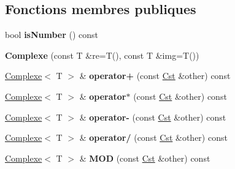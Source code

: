 \subsection*{Fonctions membres publiques}
\begin{DoxyCompactItemize}
\item 
\hypertarget{classcalcul_1_1_complexe_aaaceac3092c068cb9a47c368f072f233}{bool {\bfseries is\-Number} () const }\label{classcalcul_1_1_complexe_aaaceac3092c068cb9a47c368f072f233}

\item 
\hypertarget{classcalcul_1_1_complexe_ad37d17f91ebe787d4f19ab451200c7e0}{{\bfseries Complexe} (const T \&re=T(), const T \&img=T())}\label{classcalcul_1_1_complexe_ad37d17f91ebe787d4f19ab451200c7e0}

\item 
\hypertarget{classcalcul_1_1_complexe_aa0cc9d9fa0457a719a452758ffbb105c}{\hyperlink{classcalcul_1_1_complexe}{Complexe}$<$ T $>$ \& {\bfseries operator+} (const \hyperlink{classcalcul_1_1_cst}{Cst} \&other) const }\label{classcalcul_1_1_complexe_aa0cc9d9fa0457a719a452758ffbb105c}

\item 
\hypertarget{classcalcul_1_1_complexe_ad4d85ff5336cb7cc292688c04fb4bccd}{\hyperlink{classcalcul_1_1_complexe}{Complexe}$<$ T $>$ \& {\bfseries operator$\ast$} (const \hyperlink{classcalcul_1_1_cst}{Cst} \&other) const }\label{classcalcul_1_1_complexe_ad4d85ff5336cb7cc292688c04fb4bccd}

\item 
\hypertarget{classcalcul_1_1_complexe_abf3f2f71cc9914634a69afe681a67a25}{\hyperlink{classcalcul_1_1_complexe}{Complexe}$<$ T $>$ \& {\bfseries operator-\/} (const \hyperlink{classcalcul_1_1_cst}{Cst} \&other) const }\label{classcalcul_1_1_complexe_abf3f2f71cc9914634a69afe681a67a25}

\item 
\hypertarget{classcalcul_1_1_complexe_ac24e53f143838aff4063fdfbc9255bba}{\hyperlink{classcalcul_1_1_complexe}{Complexe}$<$ T $>$ \& {\bfseries operator/} (const \hyperlink{classcalcul_1_1_cst}{Cst} \&other) const }\label{classcalcul_1_1_complexe_ac24e53f143838aff4063fdfbc9255bba}

\item 
\hypertarget{classcalcul_1_1_complexe_a643bd98fc0db34fa8c1f665d2f8ff8f3}{\hyperlink{classcalcul_1_1_complexe}{Complexe}$<$ T $>$ \& {\bfseries M\-O\-D} (const \hyperlink{classcalcul_1_1_cst}{Cst} \&other) const }\label{classcalcul_1_1_complexe_a643bd98fc0db34fa8c1f665d2f8ff8f3}


\end{DoxyCompactItemize}
